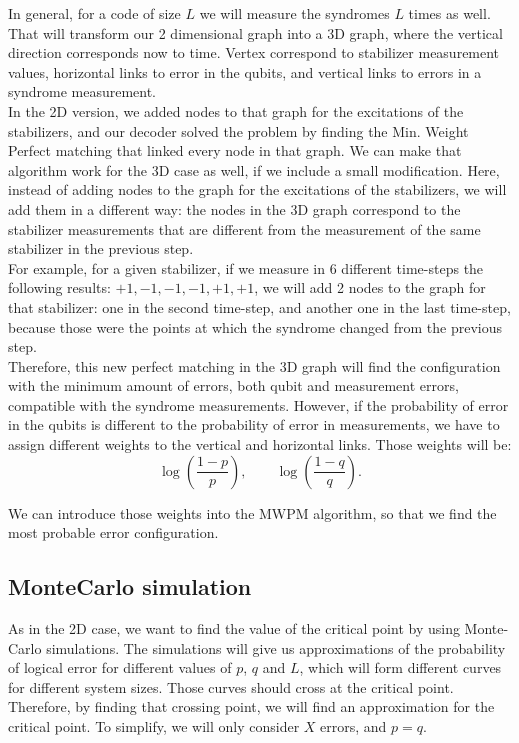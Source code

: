 \documentclass[a4paper,12pt]{article}
\begin{document}
In general, for a code of size $L$ we will measure the syndromes $L$ times as well. That will transform our 2 dimensional graph into a 3D graph, where the vertical direction corresponds now to time. Vertex correspond to stabilizer measurement values, horizontal links to error in the qubits, and vertical links to errors in a syndrome measurement.\\

In the 2D version, we added nodes to that graph for the excitations of the stabilizers, and our decoder solved the problem by finding the Min. Weight Perfect matching that linked every node in that graph. We can make that algorithm work for the 3D case as well, if we include a small modification. Here, instead of adding nodes to the graph for the excitations of the stabilizers, we will add them in a different way: the nodes in the 3D graph correspond to the stabilizer measurements that are different from the measurement of the same stabilizer in the previous step.\\
For example, for a given stabilizer, if we measure in 6 different time-steps the following results: $+1,-1,-1,-1,+1,+1$, we will add 2 nodes to the graph for that stabilizer: one in the second time-step, and another one in the last time-step, because those were the points at which the syndrome changed from the previous step.\\

Therefore, this new perfect matching in the 3D graph will find the configuration with the minimum amount of errors, both qubit and measurement errors, compatible with the syndrome measurements. However, if the probability of error in the qubits is different to the probability of error in measurements, we have to assign different weights to the vertical and horizontal links. Those weights will be:
$$\log\left(\frac{1-p}{p}\right),\quad\quad \log\left(\frac{1-q}{q}\right).$$

We can introduce those weights into the MWPM algorithm, so that we find the most probable error configuration.




\subsection{MonteCarlo simulation}
As in the 2D case, we want to find the value of the critical point by using Monte-Carlo simulations. The simulations will give us approximations of the probability of logical error for different values of $p$, $q$ and $L$, which  will form different curves for different system sizes. Those curves should cross at the critical point. Therefore, by finding that crossing point, we will find an approximation for the critical point. To simplify, we will only consider $X$ errors, and $p=q$.
\end{document}
